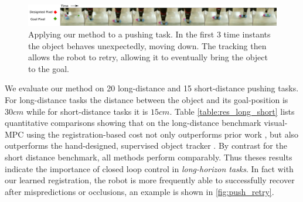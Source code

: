 
\begin{figure}
    \centering
    \includegraphics[width=1.0\textwidth]{images_rfr/push_correction.pdf}
    \caption{\small{Applying our method to a pushing task. In the first 3 time instants the object behaves unexpectedly, moving down. The tracking then allows the robot to retry, allowing it to eventually bring the object to the goal.}}
    \label{fig:push_retry}
\end{figure}


We evaluate our method on 20 long-distance and 15 short-distance pushing tasks. For long-distance tasks the distance between the object and its goal-position is $30cm$ while for short-distance tasks it is $15cm$. Table \ref{table:res_long_short} lists quantitative comparisons showing that on the long-distance benchmark visual-MPC using the registration-based cost not only outperforms prior work \cite{sna}, but also outperforms the hand-designed, supervised object tracker \cite{babenko2009visual}. By contrast for the short distance benchmark, all methods perform comparably. Thus theses results indicate the importance of closed loop control in \emph{long-horizon tasks}. In fact with our learned registration, the robot is more frequently able to successfully recover after mispredictions or occlusions, an example is shown in \autoref{fig:push_retry}.


